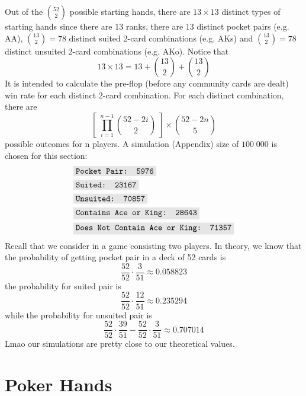 \documentclass{article}
\newcommand{\code}[1]{\colorbox{codegray}{\texttt{#1}}}
\begin{document}
Out of the $\displaystyle \binom{52}{2}$ possible starting hands, there 
are $13 \times 13$ distinct types of starting hands since there are 13 
ranks, there are 13 distinct pocket pairs (e.g. AA), $\displaystyle 
\binom{13}{2} = 78$ distinct suited 2-card combinations (e.g. AKs) 
and $\displaystyle \binom{13}{2} = 78$ distinct unsuited 2-card 
combinations (e.g. AKo). Notice that 
\[
    13 \times 13 = 13 + \binom{13}{2} + \binom{13}{2}
\]
It is intended to calculate the pre-flop 
(before any community cards are dealt) win rate for each distinct 
2-card combination. For each distinct combination, there are 
\[
    \left[ \; \prod_{i = 1}^{n - 1} \binom{52 - 2i}{2} \; \right] \times \binom{52 - 2n}{5}
\] 
possible outcomes for n players. A simulation (Appendix) 
size of $100 \; 000$ is chosen for this section:
\begin{align*}
    & \code{Pocket Pair: 5976} \\
    & \code{Suited: 23167} \\
    & \code{Unsuited: 70857} \\
    & \code{Contains Ace or King: 28643} \\
    & \code{Does Not Contain Ace or King: 71357}
\end{align*}
Recall that we consider in a game consisting two players. In theory, we 
know that the probability of getting pocket pair in a deck of 52 cards is
\[
    \frac{52}{52} \cdot \frac{3}{51} \approx \boxed{0.058823}
\]
the probability for suited pair is 
\[
    \frac{52}{52} \cdot \frac{12}{51} \approx \boxed{0.235294}
\]
while the probability for unsuited pair is 
\[
    \frac{52}{52} \cdot \frac{39}{51} - \frac{52}{52} \cdot \frac{3}{51} 
    \approx \boxed{0.707014}
\]
Lmao our simulations are pretty close to our theoretical values. 




\section*{Poker Hands}
\end{document}
